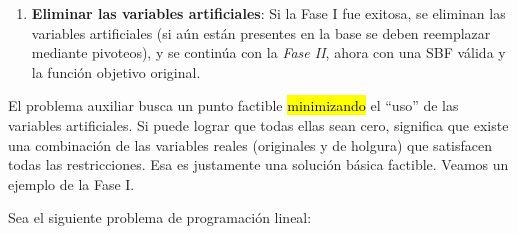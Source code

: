 \begin{enumerate}
  \item \textbf{Eliminar las variables artificiales}: Si la Fase I fue exitosa, se eliminan las variables artificiales (si aún están presentes en la base se deben reemplazar mediante pivoteos), y se continúa con la \textit{Fase II}, ahora con una SBF válida y la función objetivo original.
\end{enumerate}

El problema auxiliar busca un punto factible \hl{minimizando} el ``uso'' de las variables artificiales. Si puede lograr que todas ellas sean cero, significa que existe una combinación de las variables reales (originales y de holgura) que satisfacen todas las restricciones. Esa es justamente una solución básica factible. Veamos un ejemplo de la Fase I.

\ejemplo\label{ej:fase_1} Sea el siguiente problema de programación lineal:
